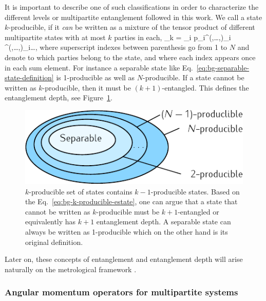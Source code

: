 It is important to describe one of such classifications in order to characterize the different levels or multipartite entanglement followed in this work.
We call a state $k$-producible, if it \emph{can} be written as a mixture of the tensor product of different multipartite states with at most $k$ parties in each,
\be
  \label{eq:bg-k-producible-estate}
  \rho_{k} = \sum_i p_i\rho^{(\alpha,\dots,\beta)}_i \otimes \rho^{(\gamma,\dots,\delta)}_i\otimes \dots,
\ee
where superscript indexes between parenthesis go from 1 to $N$ and denote to which parties belong to the state, and where each index appears once in each sum element.
For instance a separable state like Eq.~\eqref{eq:bg-separable-state-definition} is 1-producible as well as $N$-producible.
If a state cannot be written as $k$-producible, then it must be $(k+1)$-entangled.
This defines the entanglement depth, see Figure~\ref{fig:bg-separability-k-producibility-circle}.
\begin{figure}[htp]
  \centering
  \includegraphics[scale=1.2]{img/BG_separability_k_producibility_circle.pdf}
  \caption[Diagram for $k$-producibility sets]{$k$-producible set of states contains $k-1$-producible states. Based on the Eq.~\eqref{eq:bg-k-producible-estate}, one can argue that a state that cannot be written as $k$-producible must be $k+1$-entangled or equivalently has $k+1$ entanglement depth. A separable state can always be written as 1-producible which on the other hand is its original definition.}
  \label{fig:bg-separability-k-producibility-circle}
\end{figure}
Later on, these concepts of entanglement and entanglement depth will arise naturally on the metrological framework \citep{Toth2014}.

\subsubsection{Angular momentum operators for multipartite systems}
\label{sec:bg-angular-momentum-operators}

